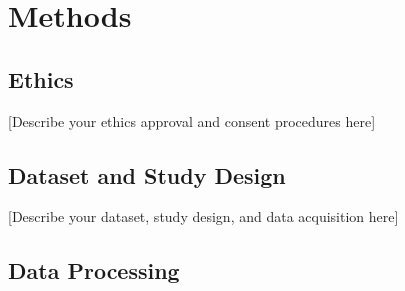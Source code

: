 
\section{Methods}


\subsection{Ethics}

[Describe your ethics approval and consent procedures here]

\subsection{Dataset and Study Design}


[Describe your dataset, study design, and data acquisition here]

\subsection{Data Processing}


